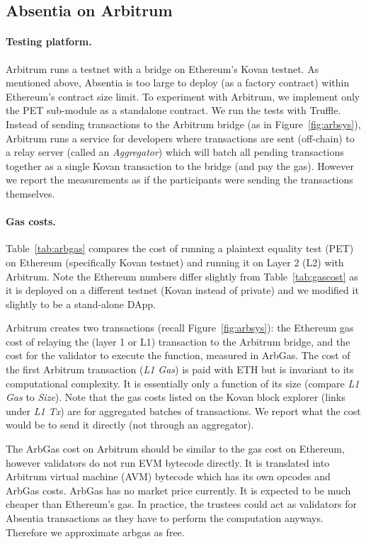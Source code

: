 \subsection{Absentia on Arbitrum}

\paragraph{Testing platform.} Arbitrum runs a testnet with a bridge on Ethereum's Kovan testnet. As mentioned above, Absentia is too large to deploy (as a factory contract) within Ethereum's contract size limit. To experiment with Arbitrum, we implement only the PET sub-module as a standalone contract. We run the tests with Truffle. Instead of sending transactions to the Arbitrum bridge (as in Figure~\ref{fig:arbsys}), Arbitrum runs a service for developers where transactions are sent (off-chain) to a relay server (called an \emph{Aggregator}) which will batch all pending transactions together as a single Kovan transaction to the bridge (and pay the gas). However we report the measurements as if the participants were sending the transactions themselves.



\paragraph{Gas costs.} Table~\ref{tab:arbgas} compares the cost of running a plaintext equality test (PET) on Ethereum (specifically Kovan testnet) and running it on Layer 2 (L2) with Arbitrum. Note the Ethereum numbers differ slightly from Table~\ref{tab:gascost} as it is deployed on a different testnet (Kovan instead of private) and we modified it slightly to be a stand-alone DApp.

Arbitrum creates two transactions (recall Figure~\ref{fig:arbsys}): the Ethereum gas cost of relaying the (layer 1 or L1) transaction to the Arbitrum bridge, and the cost for the validator to execute the function, measured in ArbGas. The cost of the first Arbitrum transaction (\emph{L1 Gas}) is paid with ETH but is invariant to its computational complexity. It is essentially only a function of its size (compare \emph{L1 Gas} to \emph{Size}).  Note that the gas costs listed on the Kovan block explorer (links under \emph{L1 Tx}) are for aggregated batches of transactions. We report what the cost would be to send it directly (not through an aggregator).

The ArbGas cost on Arbitrum should be similar to the gas cost on Ethereum, however validators do not run EVM bytecode directly. It is translated into Arbitrum virtual machine (AVM) bytecode which has its own opcodes and ArbGas costs. ArbGas has no market price currently. It is expected to be much cheaper than Ethereum's gas. In practice, the trustees could act as validators for Absentia transactions as they have to perform the computation anyways. Therefore we approximate arbgas as free.

